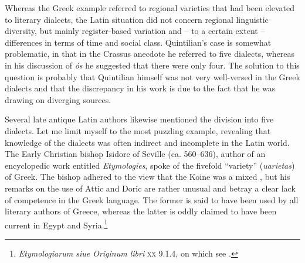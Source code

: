 Whereas the Greek example referred to regional varieties that had been elevated to literary dialects, the Latin situation did not concern regional linguistic diversity, but mainly register-based variation and – to a certain extent – differences in terms of time and social class. Quintilian’s case is somewhat problematic, in that in the Crassus anecdote he referred to five dialects, whereas in his discussion of \textit{ós} he suggested that there were only four. The solution to this question is probably that Quintilian himself was not very well-versed in the Greek dialects and that the discrepancy in his work is due to the fact that he was drawing on diverging sources.

Several late antique Latin authors likewise mentioned the division into five dialects. Let me limit myself to the most puzzling example, revealing that knowledge of the dialects was often indirect and incomplete in the Latin world. The Early Christian bishop Isidore of Seville (ca. 560–636), author of an encyclopedic work entitled \textit{Etymologies}, spoke of the fivefold “variety” (\textit{uarietas}) of Greek. The bishop adhered to the view that the Koine was a mixed , but his remarks on the use of Attic and Doric are rather unusual and betray a clear lack of competence in the Greek language. The former is said to have been used by all literary authors of Greece, whereas the latter is oddly claimed to have been current in Egypt and Syria.\footnote{\textit{Etymologiarum siue Originum libri} \textsc{xx} 9.1.4, on which see \citet[227–229]{Denecker2017}.}

